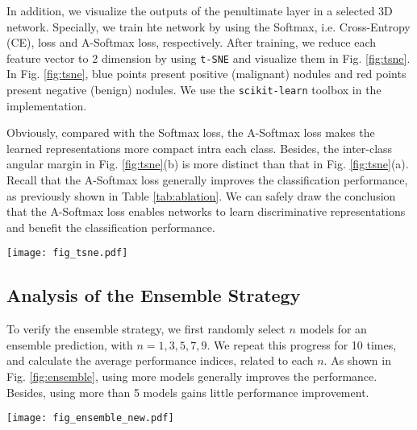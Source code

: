\documentclass[final,5p,times,twocolumn]{elsarticle}
\begin{document}
In addition, we visualize the outputs of the penultimate layer in a selected 3D network. Specially, we train hte network by using the Softmax, i.e. Cross-Entropy (CE), loss and A-Softmax loss, respectively. After training, we reduce each feature vector to 2 dimension by using \texttt{t-SNE} \cite{maaten2008tSNE} and visualize them in Fig. \ref{fig:tsne}. In Fig. \ref{fig:tsne}, blue points present positive (malignant) nodules and red points present negative (benign) nodules. We use the \texttt{scikit-learn} toolbox \cite{2011scikitlearn} in the implementation. 

Obviously, compared with the Softmax loss, the A-Softmax loss makes the learned representations more compact intra each class. Besides, the inter-class angular margin in Fig. \ref{fig:tsne}(b) is more distinct than that in Fig. \ref{fig:tsne}(a). Recall that the A-Softmax loss generally improves the classification performance, as previously shown in Table \ref{tab:ablation}. We can safely draw the conclusion that the A-Softmax loss enables networks to learn discriminative representations and benefit the classification performance.

\begin{figure*}
\centering
\texttt{[image: fig\_tsne.pdf]} \\
\caption{Visualization of the learned features: (a) the features learned by the Softmax loss and (b) those learned by the A-Softmax Loss. }
\label{fig:tsne}
\end{figure*}






\subsection{Analysis of the Ensemble Strategy}
\label{ssec:exp_ensemble}

To verify the ensemble strategy, we first randomly select $n$ models for an ensemble prediction, with $n=1, 3, 5, 7, 9$. We repeat this progress for 10 times, and calculate the average performance indices, related to each $n$.  As shown in Fig. \ref{fig:ensemble}, using more models generally improves the performance. Besides, using more than 5 models gains little performance improvement.




\begin{figure*}
\centering
\texttt{[image: fig\_ensemble\_new.pdf]} \\
\caption{Performance of the proposed method while using different number of models.}
\label{fig:ensemble}
\end{figure*}
\end{document}
